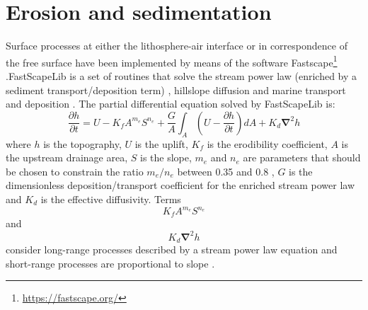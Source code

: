 \documentclass[hidelinks,10pt,a4paper]{article}
\begin{document}
\section{Erosion and sedimentation}\label{sec:erosion}
Surface processes at either the lithosphere-air interface or in correspondence of the free surface have been implemented by means of the software
Fastscape\footnote{\url{https://fastscape.org/}} \citep{Braun2013,Cordonnier2019,Yuan2019a,Yuan2019b}.FastScapeLib is a set of routines that solve the stream
power law (enriched by a sediment transport/deposition term) \citep{Yuan2019a}, hillslope diffusion and marine transport and deposition \citep{Yuan2019b}.
The partial differential equation solved by FastScapeLib is:
\begin{equation}
\frac{\partial h}{ \partial t}=U-K_f A^{m_e}S^{n_e} + \frac{G}{A}\int_A \left( U-\frac{\partial h}{\partial t} \right) dA + K_d \bm{\nabla}^2 h 
\end{equation}
where $h$ is the topography, $U$ is the uplift, $K_f$ is the erodibility coefficient, $A$ is the upstream drainage area, $S$ is the slope, $m_e$ and $n_e$ are
parameters that should be chosen to constrain the ratio $m_e/n_e$ between 0.35 and 0.8 \citep{Croissant2014,Ueda2015,Beucher2020}, $G$ is the dimensionless
deposition/transport coefficient for the enriched stream power law and $K_d$ is the effective diffusivity. Terms $$K_f A^{m_e}S^{n_e}$$ and $$K_d \bm{\nabla}^2 h$$
consider long-range processes described by a stream power law equation \citep{Tucker1999,Ueda2015,Beucher2020} and short-range processes are
proportional to slope \citep{Burov1997,Ueda2015,Beucher2020}.
\end{document}
